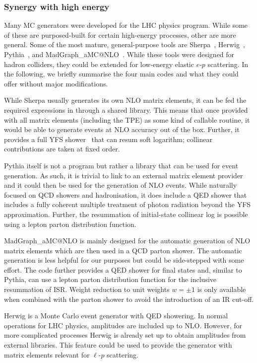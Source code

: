 \subsubsection{Synergy with high energy}
\label{sec:mc:synergy}

Many MC generators were developed for the LHC physics program.
While some of these are purposed-built for certain high-energy processes, other are more general.
Some of the most mature, general-purpose tools are {\sc Sherpa}~\cite{Gleisberg:2008ta,Sherpa:2019gpd}, {\sc Herwig}~\cite{Bahr:2008pv,Bellm:2015jjp}, {\sc Pythia}~\cite{Bierlich:2022pfr}, and {\sc MadGraph\_aMC@NLO}~\cite{Bertone:2022ktl}.
While these tools were designed for hadron colliders, they could be extended for low-energy elastic $e$-$p$ scattering.
In the following, we briefly summarise the four main codes and what they could offer without major modifications.

While {\sc Sherpa} usually generates its own NLO matrix elements, it can be fed the required expressions in through a shared library.
This means that once provided with all matrix elements (including the TPE) as some kind of callable routine, it would be able to generate events at NLO accuracy out of the box.
Further, it provides a full YFS shower~\cite{Schonherr:2008av} that can resum soft logarithm; collinear contributions are taken at fixed order.

{\sc Pythia} itself is not a program but rather a library that can be used for event generation.
As such, it is trivial to link to an external matrix element provider and it could then be used for the generation of NLO events.
While naturally focused on QCD showers and hadronisation, it does include a QED shower that includes a fully coherent multiple treatment of photon radiation beyond the YFS approximation.
Further, the resummation of initial-state collinear log is possible using a lepton parton distribution function.

{\sc MadGraph\_aMC@NLO} is mainly designed for the automatic generation of NLO matrix elements which are then used in a QCD parton shower.
The automatic generation is less helpful for our purposes but could be side-stepped with some effort.
The code further provides a QED shower for final states and, similar to {\sc Pythia}, can use a lepton parton distribution function for the inclusive resummation of ISR.
Weight reduction to unit weights $w=\pm1$ is only available when combined with the parton shower to avoid the introduction of an IR cut-off.

{\sc Herwig} is a Monte Carlo event generator with QED showering.
In normal operations for LHC physics, amplitudes are included up to NLO.
However, for more complicated processes {\sc Herwig} is already set up to obtain amplitudes from external libraries.
This feature could be used to provide the generator with matrix elements relevant for $\ell$-$p$ scattering.

